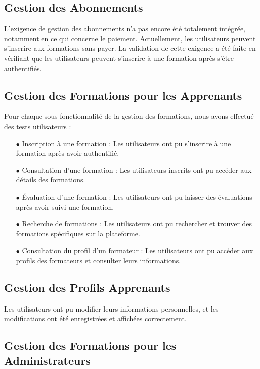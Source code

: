 \subsection{Gestion des Abonnements}

L'exigence de gestion des abonnements n'a pas encore été totalement intégrée, notamment en ce qui concerne le paiement. Actuellement, les utilisateurs peuvent s'inscrire aux formations sans payer. La validation de cette exigence a été faite en vérifiant que les utilisateurs peuvent s'inscrire à une formation après s'être authentifiés.


\subsection{Gestion des Formations pour les Apprenants}

Pour chaque sous-fonctionnalité de la gestion des formations, nous avons effectué des tests utilisateurs :
\begin{itemize}
    \item[$\bullet$] Inscription à une formation : Les utilisateurs ont pu s'inscrire à une formation après avoir authentifié. 
    \item[$\bullet$] Consultation d'une formation : Les utilisateurs inscrits ont pu accéder aux détails des formations.
    \item[$\bullet$] Évaluation d'une formation : Les utilisateurs ont pu laisser des évaluations après avoir suivi une formation.
    \item[$\bullet$] Recherche de formations : Les utilisateurs ont pu rechercher et trouver des formations spécifiques sur la plateforme.
    \item[$\bullet$] Consultation du profil d'un formateur : Les utilisateurs ont pu accéder aux profils des formateurs et consulter leurs informations.
\end{itemize}


\subsection{Gestion des Profils Apprenants}

Les utilisateurs ont pu modifier leurs informations personnelles, et les modifications ont été enregistrées et affichées correctement.

\subsection{Gestion des Formations pour les Administrateurs}


